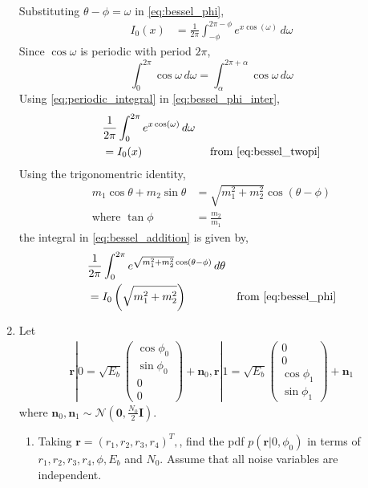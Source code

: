 \documentclass[journal,10pt,twocolumn]{IEEEtran}
\providecommand{\brak}[1]{\ensuremath{\left(#1\right)}}
\newcommand{\myvec}[1]{\ensuremath{\begin{pmatrix}#1\end{pmatrix}}}
\begin{document}
\begin{enumerate}
\begin{align*}
\end{align*}
Substituting $\theta-\phi = \omega$ in \eqref{eq:bessel_phi},
\begin{align}
	\label{eq:bessel_phi_inter}
	I_{0}(x) &= \frac{1}{2\pi}\int_{-\phi}^{2\pi-\phi}e^{x\cos\brak{\omega}}\,d\omega
\end{align}
Since $\cos \omega$ is periodic with period $2\pi$,
\begin{equation}
	\int_{0}^{2\pi} \cos \omega \,d\omega = \int_{\alpha}^{2\pi+\alpha} \cos \omega \,d\omega
	\label{eq:periodic_integral}
\end{equation}
Using \eqref{eq:periodic_integral} in \eqref{eq:bessel_phi_inter},
\begin{align*}
	& \frac{1}{2\pi}\int_{0}^{2\pi}e^{x\cos\brak{\omega}}\,d\omega\\
	&= I_{0}(x) &\text{ from \eqref{eq:bessel_twopi}}
\end{align*}
Using the trigonomentric identity,
\begin{align}
	\label{eq:trig_identity_ab}
	m_1\cos\theta + m_2\sin\theta &= \sqrt{m_1^2+m_2^2}\cos\brak{\theta-\phi}\\
	\nonumber
	\text{where } \tan \phi &= \frac{m_2}{m_1} 
\end{align}
the integral in \eqref{eq:bessel_addition} is given by,
\begin{align*}
	&\frac{1}{2\pi}\int_{0}^{2\pi}e^{\sqrt{m_1^2+m_2^2}\cos\brak{\theta-\phi}}\,d\theta \\
	&= I_{0}\brak{\sqrt{m_1^2+m_2^2}} &\text{from \eqref{eq:bessel_phi}} 
\end{align*}
\item
Let
%
\begin{align}
\mathbf{r}|0= \sqrt{E_b}
\myvec{
\cos \phi_0\\
\sin \phi_0 \\
0\\
0
}
+\mathbf{n}_0,
\mathbf{r}|1= \sqrt{E_b}
\myvec{
0\\
0 \\
\cos \phi_1\\
\sin \phi_1 
}
+\mathbf{n}_1
\end{align}
%
where $\mathbf{n}_0,\mathbf{n}_1\sim \mathcal{N}\brak{\mathbf{0}, \frac{N_0}{2}\mathbf{I}}$.
%
\begin{enumerate}[label=(\alph{enumii})]
\item Taking $\mathbf{r} = \brak{r_1,r_2,r_3,r_4}^{T},$, find the pdf $p\brak{\mathbf{r}|0,\phi_0}$ in
terms of $r_1,r_2,r_3,r_4,\phi,E_b$ and $N_0$. Assume that all noise variables are independent.\\

\end{enumerate}
\end{enumerate}
\end{document}
